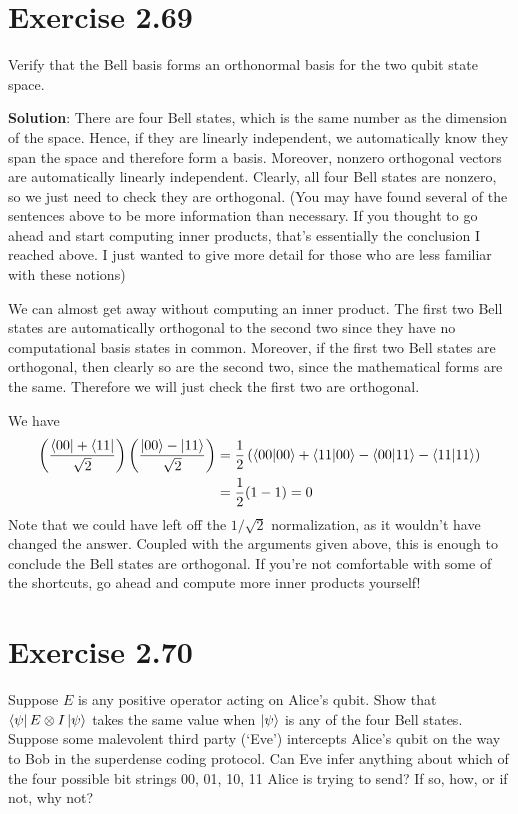 \documentclass{book}
\begin{document}
\section*{Exercise 2.69}
    Verify that the Bell basis forms an orthonormal basis for the two qubit state space.

    \textbf{Solution}: There are four Bell states, which is the same number as the dimension of the space. Hence, if they are linearly independent, we automatically know they span the space and therefore form a basis. Moreover, nonzero orthogonal vectors are automatically linearly independent. Clearly, all four Bell states are nonzero, so we just need to check they are orthogonal. (You may have found several of the sentences above to be more information than necessary. If you thought to go ahead and start computing inner products, that's essentially the conclusion I reached above. I just wanted to give more detail for those who are less familiar with these notions)

    We can almost get away without computing an inner product. The first two Bell states are automatically orthogonal to the second two since they have no computational basis states in common. Moreover, if the first two Bell states are orthogonal, then clearly so are the second two, since the mathematical forms are the same. Therefore we will just check the first two are orthogonal.

    We have
    \begin{align}
    \begin{aligned}
        \left(\frac{\bra{00}+\bra{11}}{\sqrt{2}}\right) \left(\frac{\ket{00} - \ket{11}}{\sqrt{2}}\right) &= \frac{1}{2}\left(\braket{00}{00} + \braket{11}{00} - \braket{00}{11}-\braket{11}{11}\right) \\
        &=\frac{1}{2}(1 - 1) = 0
    \end{aligned}
    \end{align}
    Note that we could have left off the $1/\sqrt{2}$ normalization, as it wouldn't have changed the answer. Coupled with the arguments given above, this is enough to conclude the Bell states are orthogonal. If you're not comfortable with some of the shortcuts, go ahead and compute more inner products yourself!

\section*{Exercise 2.70}
    Suppose $E$ is any positive operator acting on Alice’s qubit. Show that $\bra{\psi} E \otimes I\ket{\psi}$ takes the same value when $\ket{\psi}$ is any of the four Bell states. Suppose some malevolent third party (‘Eve’) intercepts Alice’s qubit on the way to Bob in the superdense coding protocol. Can Eve infer anything about which of the four possible bit strings 00, 01, 10, 11 Alice is trying to send? If so, how, or if not, why not?
\end{document}

